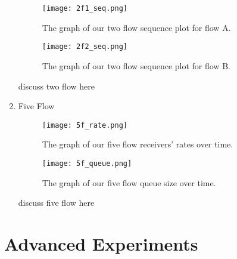 \documentclass[11pt]{article}
\begin{document}
\begin{enumerate}
\begin{figure}[H]
\caption{The graph of our two flow sequence plot for flow A.}
  \label{figure9}
    \centering
    \texttt{[image: 2f1\_seq.png]}
\end{figure}

\begin{figure}[H]
\caption{The graph of our two flow sequence plot for flow B.}
  \label{figure10}
    \centering
    \texttt{[image: 2f2\_seq.png]}
\end{figure}

discuss two flow here

\bigskip
  \item Five Flow

\begin{figure}[H]
\caption{The graph of our five flow receivers' rates over time.}
  \label{figure11}
    \centering
    \texttt{[image: 5f\_rate.png]}
\end{figure}

\begin{figure}[H]
\caption{The graph of our five flow queue size over time.}
  \label{figure12}
    \centering
    \texttt{[image: 5f\_queue.png]}
\end{figure}

discuss five flow here

\end{enumerate}

\section{Advanced Experiments}
\end{document}
